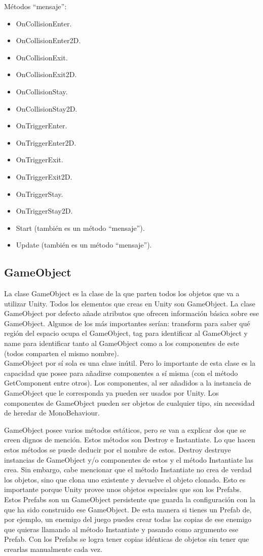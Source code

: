 Métodos “mensaje”:
\begin{itemize}
\item
OnCollisionEnter.
\item
OnCollisionEnter2D.
\item
OnCollisionExit.
\item
OnCollisionExit2D.
\item
OnCollisionStay.
\item
OnCollisionStay2D.
\item
OnTriggerEnter.
\item
OnTriggerEnter2D.
\item
OnTriggerExit.
\item
OnTriggerExit2D.
\item
OnTriggerStay.
\item
OnTriggerStay2D.
\item
Start (también es un método “mensaje”).
\item
Update (también es un método “mensaje”).
\end{itemize}

\subsection{GameObject \cite{ClaseGameObject}}
La clase GameObject es la clase de la que parten todos los objetos que va a utilizar Unity. Todos los elementos que creas en Unity son GameObject. La clase GameObject por defecto añade atributos que ofrecen información básica sobre ese GameObject. Algunos de los más importantes serían: transform para saber qué región del espacio ocupa el GameObject, tag para identificar al GameObject y name para identificar tanto al GameObject como a los componentes de este (todos comparten el mismo nombre).\\
GameObject por sí sola es una clase inútil. Pero lo importante de esta clase es la capacidad que posee para añadirse componentes a sí misma (con el método GetComponent entre otros). Los componentes, al ser añadidos a la instancia de GameObject que le corresponda ya pueden ser usados por Unity. Los componentes de GameObject pueden ser objetos de cualquier tipo, sin necesidad de heredar de MonoBehaviour.

GameObject posee varios métodos estáticos, pero se van a explicar dos que se creen dignos de mención. Estos métodos son Destroy e Instantiate. Lo que hacen estos métodos se puede deducir por el nombre de estos. Destroy destruye instancias de GameObject y/o componentes de estos y el método Instantiate las crea. Sin embargo, cabe mencionar que el método Instantiate no crea de verdad los objetos, sino que clona uno existente y devuelve el objeto clonado. Esto es importante porque Unity provee unos objetos especiales que son los Prefabs. Estos Prefabs son un GameObject persistente que guarda la configuración con la que ha sido construido ese GameObject. De esta manera si tienes un Prefab de, por ejemplo, un enemigo del juego puedes crear todas las copias de ese enemigo que quieras llamando al método Instantiate y pasando como argumento ese Prefab. Con los Prefabs se logra tener copias idénticas de objetos sin tener que crearlas manualmente cada vez.

